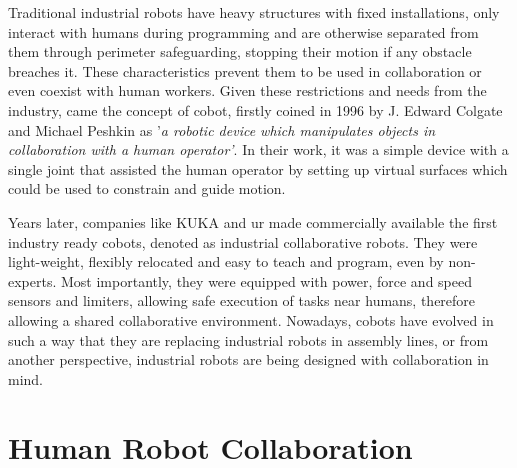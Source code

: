 \par Traditional industrial robots have heavy structures with fixed installations, only interact with humans during programming and are otherwise separated from them through perimeter safeguarding, stopping their motion if any obstacle breaches it. These characteristics prevent them to be used in collaboration or even coexist with human workers. Given these restrictions and needs from the industry, came the concept of \ac{cobot}, firstly coined in 1996 by J. Edward Colgate and Michael Peshkin \cite{cobot.old} as '\textit{a robotic device which manipulates objects in collaboration with a human operator'}. In their work, it was a simple device with a single joint that assisted the human operator by setting up virtual surfaces which could be used to constrain and guide motion.

\par Years later, companies like KUKA and \ac{ur} made commercially available the first industry ready cobots, denoted as industrial collaborative robots. They were light-weight, flexibly relocated and easy to teach and program, even by non-experts. Most importantly, they were equipped with power, force and speed sensors and limiters, allowing safe execution of tasks near humans, therefore allowing a shared collaborative environment. 
% 
Nowadays, cobots have evolved in such a way that they are replacing industrial robots in assembly lines, or from another perspective, industrial robots are being designed with collaboration in mind.




\section{Human Robot Collaboration}

